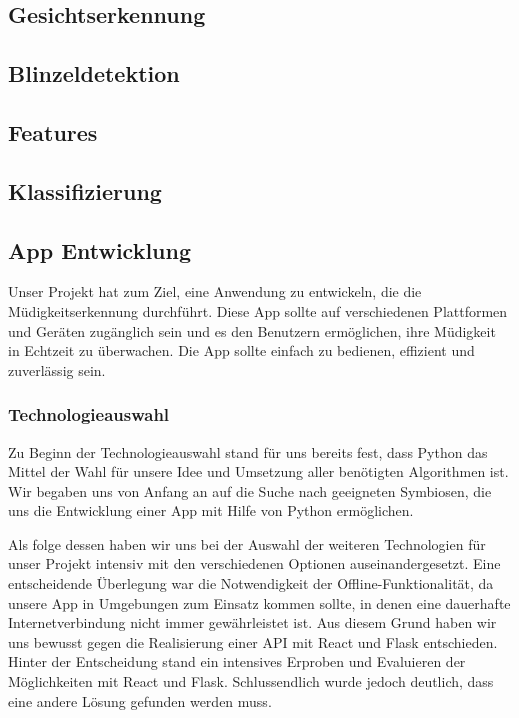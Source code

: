 \subsection{Gesichtserkennung}
\label{sec:facedetection}

\subsection{Blinzeldetektion}
\label{sec:blinkdetection}

\subsection{Features}
\label{sec:features}

\subsection{Klassifizierung}
\label{sec:classification}

\subsection{App Entwicklung}
\label{ssec:appEntwicklung}
	Unser Projekt hat zum Ziel, eine Anwendung zu entwickeln, die die Müdigkeitserkennung durchführt. Diese App sollte auf verschiedenen Plattformen und Geräten zugänglich sein und es den Benutzern ermöglichen, ihre Müdigkeit in Echtzeit zu überwachen. Die App sollte einfach zu bedienen, effizient und zuverlässig sein. 
	
	\subsubsection{Technologieauswahl}
	\label{sssec:technologie}
		
		Zu Beginn der Technologieauswahl stand für uns bereits fest, dass Python das Mittel der Wahl für unsere Idee und Umsetzung aller benötigten Algorithmen ist. Wir begaben uns von Anfang an auf die Suche nach geeigneten Symbiosen, die uns die Entwicklung einer App mit Hilfe von Python ermöglichen.

		Als folge dessen haben wir uns bei der Auswahl der weiteren Technologien für unser Projekt intensiv mit den verschiedenen Optionen auseinandergesetzt. Eine entscheidende Überlegung war die Notwendigkeit der Offline-Funktionalität, da unsere App in Umgebungen zum Einsatz kommen sollte, in denen eine dauerhafte Internetverbindung nicht immer gewährleistet ist. Aus diesem Grund haben wir uns bewusst gegen die Realisierung einer API mit React und Flask entschieden. Hinter der Entscheidung stand ein intensives Erproben und Evaluieren der Möglichkeiten mit React und Flask. Schlussendlich wurde jedoch deutlich, dass eine andere Lösung gefunden werden muss.

